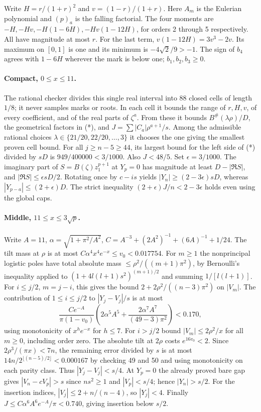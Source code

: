 Write \(H=r/(1+r)^2\) and \(v=(1-r)/(1+r)\). Here \(A_m\) is the Eulerian polynomial and \((p)_a\) is the falling factorial. The four moments are \(-H,-Hv,-H(1-6H),-Hv(1-12H)\), for orders 2 through 5 respectively. All have magnitude at most \(r\). For the last term, \(v(1-12H)=3v^3-2v\). Its maximum on \([0,1]\) is one and its minimum is \(-4\sqrt2/9>-1\). The sign of \(b_4\) agrees with \(1-6H\) wherever the mark is below one; \(b_1,b_2,b_3\ge0\).



\paragraph{Compact, \(0\le x\le11\).} The rational checker divides this single real interval into 88 closed cells of length \(1/8\); it never samples marks or roots. In each cell it bounds the range of \(r,H,v\), of every coefficient, and of the real parts of \(\zeta^a\). From these it bounds \(B^\#(\lambda\rho)/D\), the geometrical factors in (*), and \(J=\sum |C_a|\rho^{a+1}/s\). Among the admissible rational choices \(\lambda\in\{21/20,22/20,\ldots,3\}\) it chooses the one giving the smallest proven cell bound. For all \(j\ge n-5\ge44\), its largest bound for the left side of (*) divided by \(sD\) is \(949/400000<3/1000\). Also \(J<48/5\). Set \(\epsilon=3/1000\). The imaginary part of \(S=B(\zeta)z_1^{p+1}\) at \(Y_p=0\) has magnitude at least \(D-|\Re S|\), and \(|\Re S|\le\epsilon sD/2\). Rotating once by \(c-is\) yields \(|Y_n|\ge(2-3\epsilon)sD\), whereas \(|Y_{p-a}|\le(2+\epsilon)D\). The strict inequality \((2+\epsilon)J/n<2-3\epsilon\) holds even using the global caps.
\paragraph{Middle, \(11\le x\le3\sqrt p\).} Write \(A=11\), \(\alpha=\sqrt{1+\pi^2/A^2}\), \(C=A^{-3}+(2A^2)^{-1}+(6A)^{-1}+1/24\). The tilt mass at \(\rho\) is at most \(C\alpha^4 x^4 e^{-x}\le v_0<0.017754\). For \(m\ge1\) the nonprincipal logistic poles have total absolute mass \(\le\rho^2/((m+1)\pi^2)\), by Bernoulli's inequality applied to \((1+4l(l+1)s^2)^{(m+1)/2}\) and summing \(1/[l(l+1)]\). For \(i\le j/2\), \(m=j-i\), this gives the bound \(2+2\rho^2/((n-3)\pi^2)\) on \(|V_m|\). The contribution of \(1\le i\le j/2\) to \(|Y_j-V_j|/s\) is at most
\[
 \frac{Ce^{-A}}{\pi(1-v_0)}\left(2\alpha^5 A^5+
 \frac{2\alpha^7 A^7}{(49-3)\pi^2}\right)<0.170,
\]
using monotonicity of \(x^h e^{-x}\) for \(h\le7\). For \(i>j/2\) bound \(|V_m|\le2\rho^2/x\) for all \(m\ge0\), including order zero. The absolute tilt at \(2\rho\) costs \(e^{16v_0}<2\). Since \(2\rho^3/(\pi x)<7n\), the remaining error divided by \(s\) is at most \(14n/2^{\lfloor(n-5)/2\rfloor}<0.000167\) by checking 49 and 50 and using monotonicity on each parity class. Thus \(|Y_j-V_j|<s/4\). At \(Y_p=0\) the already proved bare gap gives \(|V_n-cV_p|>s\) since \(ns^2\ge1\) and \(|V_p|<s/4\); hence \(|Y_n|>s/2\). For the insertion indices, \(|V_j|\le2+n/(n-4)\), so \(|Y_j|<4\). Finally \(J\le C\alpha^6A^6e^{-A}/\pi<0.740\), giving insertion below \(s/2\).
